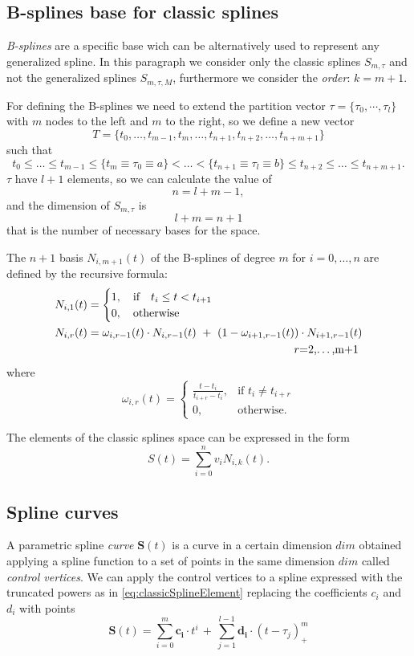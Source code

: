 \documentclass[dissertation.tex]{subfiles}
\begin{document}
\subsection{B-splines base for classic splines}\label{sec:bsplines}
\emph{B-splines} are a specific base wich can be alternatively used to
represent any generalized spline. In this
paragraph we consider only the classic splines $S_{m,\tau}$ and not
the generalized splines $S_{m,\tau,M}$, furthermore we consider the
\emph{order}: $k=m+1$.

For defining the B-splines we need to extend the partition vector
$\tau=\{\tau_0,\cdots,\tau_l\}$ with $m$ nodes to the left and $m$ to
the right, so we define a new vector
$$
T=\{t_0,\dots,t_{m-1},t_{m},\dots,t_{n+1},t_{n+2},\dots,t_{n+m+1}\}
$$
such that
$$
t_0\leq\dots\leq t_{m-1}\leq \{t_{m}\equiv\tau_0\equiv a\}<\dots<
\{t_{n+1}\equiv\tau_l\equiv b\}\leq t_{n+2}\leq\dots\leq t_{n+m+1}.
$$
$\tau$ have $l+1$ elements, so we can calculate the value of
$$
n=l+m-1,
$$
and the dimension of $S_{m,\tau}$ is
$$
l+m=n+1
$$
that is the number of necessary bases for the space.

The $n+1$ basis $N_{i,m+1}(t)$ of the B-splines of degree $m$ for
$i=0,\dots,n$ are defined by the 
recursive formula:
\begin{align*}
  N_{i,1}(t) &=
  \begin{cases}
    1,\quad \mbox{if}\quad t_i\leq t<t_{i+1}\\
    0,\quad \mbox{otherwise}
  \end{cases}\\
  N_{i,r}(t) &= \omega_{i,r-1}(t)\cdot N_{i,r-1}(t)\ +\
  (1-\omega_{i+1,r-1}(t))\cdot N_{i+1,r-1}(t)\\
             &\pushright r=2,\dots,m+1
\end{align*}
where
$$
\omega_{i,r}(t) = \begin{cases}
  \frac{t-t_i}{t_{i+r}-t_i},&\mbox{if }t_i\neq t_{i+r}\\
  0, &\mbox{otherwise.}
\end{cases}
$$

The elements of the classic splines space can be expressed in the form
\begin{equation}\label{eq:bsplineElement}
  S(t)=\sum_{i=0}^nv_i N_{i,k}(t).
\end{equation}

\subsection{Spline curves}
A parametric spline \emph{curve} $\mathbf{S}(t)$ is a curve in a certain
dimension $dim$ obtained applying a spline function to a set of points
in the same dimension $dim$
called \emph{control vertices}. We can apply the control vertices to a
spline expressed with the truncated powers as in
\cref{eq:classicSplineElement} replacing the coefficients $c_i$ and
$d_i$ with points
\begin{equation}\label{eq:classicSplineCurve}
  \mathbf{S}(t)=\sum_{i=0}^m \mathbf{c_i}\cdot t^i\, +\, \sum_{j=1}^{l-1} \mathbf{d_i}\cdot (t-\tau_j)_+^m  
\end{equation}
\end{document}
